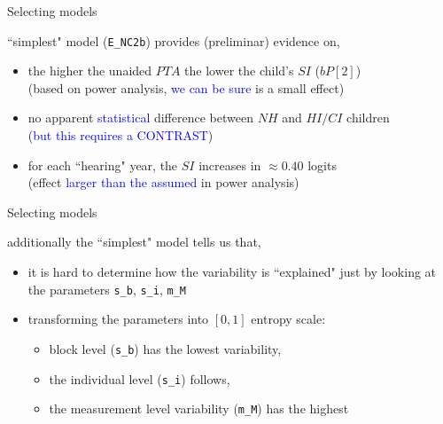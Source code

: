%
%
\begin{lhframe}[rhgraphic={\texttt{[image: select\_model1.png]}}]
	{Selecting models}
	
	``simplest" model (\texttt{E\_NC2b}) provides (preliminar) evidence on,
	\begin{itemize}
		\item the higher the unaided $PTA$ the lower the child's $SI$ ($bP[2]$)\\
		{\small (based on power analysis, \textcolor{blue}{we can be sure} is a small effect) }
		\item no apparent \textcolor{blue}{statistical} difference between $NH$ and $HI/CI$ children \\
		{\small (\textcolor{blue}{but this requires a CONTRAST}) }
		\item for each ``hearing" year, the $SI$ increases in $\approx 0.40$ logits \\
		{\small (effect \textcolor{blue}{larger than the assumed} in power analysis) }
	\end{itemize}
\end{lhframe}
%
%
\begin{lhframe}[rhgraphic={\texttt{[image: variability\_plot.pdf]}}]
	{Selecting models}
	
	additionally the ``simplest" model tells us that,
	\begin{itemize}
		\item it is hard to determine how the variability is ``explained" just by looking at the parameters \texttt{s\_b}, \texttt{s\_i}, \texttt{m\_M}
		\item transforming the parameters into $[0,1]$ entropy scale:
		\begin{itemize}
			\item block level (\texttt{s\_b}) has the lowest variability,
			\item the individual level (\texttt{s\_i}) follows,
			\item the measurement level variability (\texttt{m\_M}) has the highest
		\end{itemize}
	\end{itemize}
\end{lhframe}
%
%
